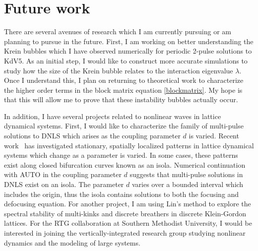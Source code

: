 \documentclass[12pt,reqno,oneside]{article}
\theoremstyle{definition}
\theoremstyle{remark}
\begin{document}
\section{Future work}

There are several avenues of research which I am currently pursuing or am planning to pursue in the future. First, I am working on better understanding the Krein bubbles which I have observed numerically for periodic 2-pulse solutions to KdV5. As an initial step, I would like to construct more accurate simulations to study how the size of the Krein bubble relates to the interaction eigenvalue $\lambda$. Once I understand this, I plan on returning to theoretical work to characterize the higher order terms in the block matrix equation \cref{blockmatrix}. My hope is that this will allow me to prove that these instability bubbles actually occur. 

In addition, I have several projects related to nonlinear waves in lattice dynamical systems. First, I would like to characterize the family of multi-pulse solutions to DNLS which arises as the coupling parameter $d$ is varied. Recent work~\cite{Jason2019} has investigated stationary, spatially localized patterns in lattice dynamical systems which change as a parameter is varied. In some cases, these patterns exist along closed bifurcation curves known as an isola. Numerical continuation with AUTO in the coupling parameter $d$ suggests that multi-pulse solutions in DNLS exist on an isola. The parameter $d$ varies over a bounded interval which includes the origin, thus the isola contains solutions to both the focusing and defocusing equation. For another project, I am using Lin's method to explore the spectral stability of multi-kinks and discrete breathers in discrete Klein-Gordon lattices. For the RTG collaboration at Southern Methodist University, I would be interested in joining the vertically-integrated research group studying nonlinear dynamics and the modeling of large systems.




\end{document}
